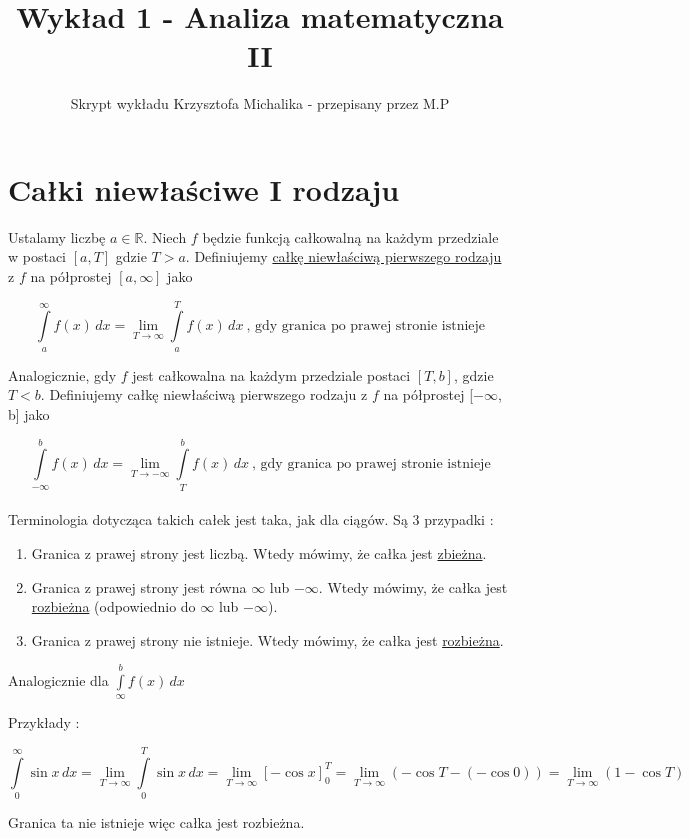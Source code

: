 \documentclass[12pt]{article}
\author{Skrypt wykładu Krzysztofa Michalika - przepisany przez M.P}
\title{Wykład 1 - Analiza matematyczna II}
\begin{document}
\maketitle

\section{Całki niewłaściwe I rodzaju}

Ustalamy liczbę $a \in \mathbb{R}$. Niech $f$ będzie funkcją całkowalną na każdym przedziale \linebreak w postaci $[a, T]$
gdzie $T > a$. Definiujemy \underline{całkę niewłaściwą pierwszego rodzaju} z $f$ na półprostej $[a, \infty]$ jako

$$ \int\limits_{a}^{\infty} f(x) \,dx = \lim_{T \to \infty} \int\limits_{a}^{T} f(x) \,dx \ \text{,  gdy granica po prawej stronie istnieje} $$

Analogicznie, gdy $f$ jest całkowalna na każdym przedziale postaci $[T, b]$, gdzie $T < b$. Definiujemy całkę niewłaściwą
pierwszego rodzaju z $f$ na półprostej [$-\infty$, b] jako

$$ \int\limits_{-\infty}^{b} f(x) \,dx = \lim_{T \to -\infty} \int\limits_{T}^{b} f(x) \,dx \ \text{,  gdy granica po prawej stronie istnieje} $$\\

Terminologia dotycząca takich całek jest taka, jak dla ciągów. Są 3 przypadki :

\begin{enumerate}
    \item Granica z prawej strony jest liczbą. Wtedy mówimy, że całka jest \underline{zbieżna}.
    \item Granica z prawej strony jest równa $\infty$ lub $-\infty$. Wtedy mówimy, że całka jest \underline{rozbieżna} (odpowiednio do $\infty$ lub $-\infty$).
    \item Granica z prawej strony nie istnieje. Wtedy mówimy, że całka jest \underline{rozbieżna}.
\end{enumerate}

Analogicznie dla $ \int\limits_{\infty}^{b} f(x)\,dx $

Przykłady :

$$ \int\limits_{0}^{\infty} \sin x \,dx = \lim_{T \to \infty} \int\limits_{0}^{T} \sin x \,dx = 
\lim_{T \to \infty} [-\cos x]_0^T = \lim_{T \to \infty} (-\cos T - (- \cos 0)) = \lim_{T \to \infty} (1 - \cos T) $$

Granica ta nie istnieje więc całka jest rozbieżna. \\
\end{document}

